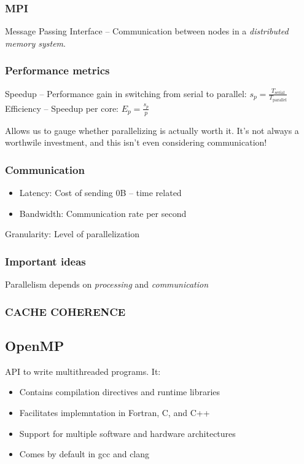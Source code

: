 \documentclass[11pt]{article}
\begin{document}
\subsubsection{MPI}
\label{sec-1-1-4}
Message Passing Interface -- Communication between nodes in a \emph{distributed memory system}.
\subsubsection{Performance metrics}
\label{sec-1-1-5}
Speedup -- Performance gain in switching from serial to parallel: $s_p=\frac{T_\text{serial}}{T_\text{parallel}}$
Efficiency -- Speedup per core:
$E_p=\frac{s_p}{p}$

Allows us to gauge whether parallelizing is actually worth it. It's not always a worthwile investment, and this isn't even considering communication!

\subsubsection{Communication}
\label{sec-1-1-6}
\begin{itemize}
\item Latency: Cost of sending 0B -- time related
\item Bandwidth: Communication rate per second
\end{itemize}

Granularity: Level of parallelization

\subsubsection{Important ideas}
\label{sec-1-1-7}
Parallelism depends on \emph{processing} and \emph{communication}

\subsubsection{CACHE COHERENCE}
\label{sec-1-1-8}


\subsection{OpenMP}
\label{sec-1-2}
API to write multithreaded programs. It:
\begin{itemize}
\item Contains compilation directives and runtime libraries
\item Facilitates implemntation in Fortran, C, and C++
\item Support for multiple software and hardware architectures
\item Comes by default in gcc and clang
\end{itemize}
\end{document}
